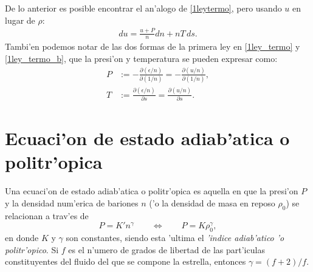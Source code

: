 De lo anterior es posible encontrar el an'alogo de \eqref{1leytermo}, pero usando $u$ en lugar de $\rho$:
\begin{align}
  du=\frac{u+P}{n}dn + nT\,ds.
\end{align}
Tambi'en podemos notar de las dos formas de la primera ley en \eqref{1ley_termo} y \eqref{1ley_termo_b}, que la presi'on y temperatura se pueden expresar como:
\begin{align}
 P&:=-\frac{\partial (\epsilon/n)}{\partial(1/n)}=-\frac{\partial (u/n)}{\partial(1/n)} \label{def_presion},\\
T&:=\frac{\partial (\epsilon/n)}{\partial s}=\frac{\partial (u/n)}{\partial s}\label{def_temperatura}.
\end{align}

\section{Ecuaci'on de estado adiab'atica o politr'opica}
Una ecuaci'on de estado adiab'atica o politr'opica es aquella en que la presi'on $P$ y la densidad num'erica de bariones $n$ ('o la densidad de masa en reposo $\rho_0$) se relacionan a trav'es de
\begin{equation}\label{estadopolitropica_general}
 P=K'n^{\gamma}\qquad\Leftrightarrow\qquad P=K\rho_0^{\gamma},
\end{equation}
en donde $K$ y $\gamma$ son constantes, siendo esta 'ultima el \textit{'indice adiab'atico 'o politr'opico}. Si $f$ es el n'umero de grados de libertad de las part'iculas constituyentes del fluido del que se compone la estrella, entonces $\gamma=(f+2)/f$. 

